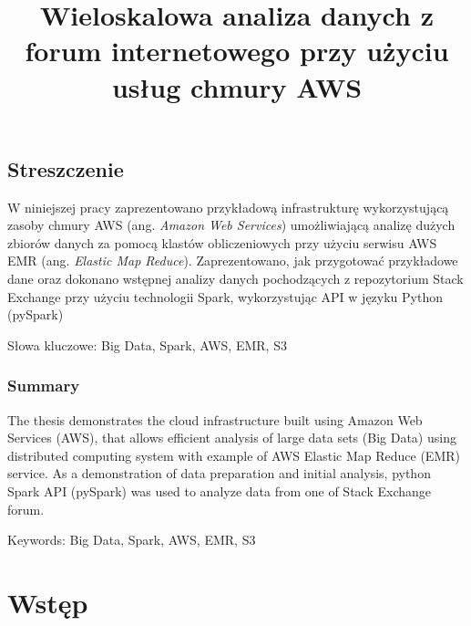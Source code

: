 \documentclass[
  letterpaper,
  DIV=11,
  numbers=noendperiod]{scrreprt}
\title{Wieloskalowa analiza danych z forum internetowego przy użyciu
usług chmury AWS}
\author{}
\date{}
\renewcommand*\contentsname{Spis treści}
\newcommand\contentsname{Spis treści}
\begin{document}
\maketitle
\ifdefined\Shaded\renewenvironment{Shaded}{\begin{tcolorbox}[frame hidden, borderline west={3pt}{0pt}{shadecolor}, boxrule=0pt, interior hidden, breakable, enhanced, sharp corners]}{\end{tcolorbox}}\fi

\renewcommand*\contentsname{Spis treści}
{
\hypersetup{linkcolor=}
\setcounter{tocdepth}{2}
\tableofcontents
}

\hypertarget{streszczenie}{%
\chapter*{Streszczenie}\label{streszczenie}}


W niniejszej pracy zaprezentowano przykładową infrastrukturę
wykorzystującą zasoby chmury AWS (ang. \emph{Amazon Web Services})
umożliwiającą analizę dużych zbiorów danych za pomocą klastów
obliczeniowych przy użyciu serwisu AWS EMR (ang. \emph{Elastic Map
Reduce}). Zaprezentowano, jak przygotować przykładowe dane oraz dokonano
wstępnej analizy danych pochodzących z repozytorium Stack Exchange przy
użyciu technologii Spark, wykorzystując API w języku Python (pySpark)

Słowa kluczowe: Big Data, Spark, AWS, EMR, S3

\hypertarget{summary}{%
\section*{Summary}\label{summary}}


The thesis demonstrates the cloud infrastructure built using Amazon Web
Services (AWS), that allows efficient analysis of large data sets (Big
Data) using distributed computing system with example of AWS Elastic Map
Reduce (EMR) service. As a demonstration of data preparation and initial
analysis, python Spark API (pySpark) was used to analyze data from one
of Stack Exchange forum.

Keywords: Big Data, Spark, AWS, EMR, S3

\part{Wstęp}
\end{document}
